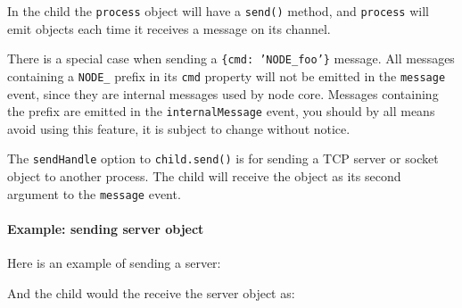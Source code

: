 In the child the \texttt{process} object will have a \texttt{send()}
method, and \texttt{process} will emit objects each time it receives a
message on its channel.

There is a special case when sending a \texttt{\{cmd: 'NODE\_foo'\}}
message. All messages containing a \texttt{NODE\_} prefix in its
\texttt{cmd} property will not be emitted in the \texttt{message} event,
since they are internal messages used by node core. Messages containing
the prefix are emitted in the \texttt{internalMessage} event, you should
by all means avoid using this feature, it is subject to change without
notice.

The \texttt{sendHandle} option to \texttt{child.send()} is for sending a
TCP server or socket object to another process. The child will receive
the object as its second argument to the \texttt{message} event.

\paragraph{Example: sending server object}

Here is an example of sending a server:

\begin{Shaded}
\begin{Highlighting}[]
 \NormalTok{(}\NormalTok{);}

 \NormalTok{();}
\NormalTok{(}\NormalTok{, } 
  \NormalTok{(}\NormalTok{);}
\NormalTok{\});}
\NormalTok{(}\NormalTok{, }\NormalTok{() \{}
  \NormalTok{(}
\NormalTok{\});}
\end{Highlighting}
\end{Shaded}

And the child would the receive the server object as:

\begin{Shaded}
\begin{Highlighting}[]
\NormalTok{(}\NormalTok{, }
   \NormalTok{) \{}
    \NormalTok{(}\NormalTok{, } 
      \NormalTok{(}\NormalTok{);}
    \NormalTok{\});}
  \NormalTok{\}}
\NormalTok{\});}
\end{Highlighting}
\end{Shaded}

